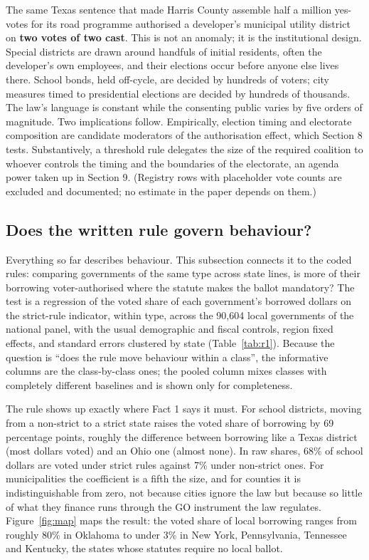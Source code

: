 
The same Texas sentence that made Harris County assemble half a million yes-votes for its road programme authorised a developer's municipal utility district on \textbf{two votes of two cast}. This is not an anomaly; it is the institutional design. Special districts are drawn around handfuls of initial residents, often the developer's own employees, and their elections occur before anyone else lives there. School bonds, held off-cycle, are decided by hundreds of voters; city measures timed to presidential elections are decided by hundreds of thousands. The law's language is constant while the consenting public varies by five orders of magnitude. Two implications follow. Empirically, election timing and electorate composition are candidate moderators of the authorisation effect, which Section 8 tests. Substantively, a threshold rule delegates the size of the required coalition to whoever controls the timing and the boundaries of the electorate, an agenda power taken up in Section 9. (Registry rows with placeholder vote counts are excluded and documented; no estimate in the paper depends on them.)

\subsection{Does the written rule govern behaviour?}
Everything so far describes behaviour. This subsection connects it to the coded rules: comparing governments of the same type across state lines, is more of their borrowing voter-authorised where the statute makes the ballot mandatory? The test is a regression of the voted share of each government's borrowed dollars on the strict-rule indicator, within type, across the 90,604 local governments of the national panel, with the usual demographic and fiscal controls, region fixed effects, and standard errors clustered by state (Table~\ref{tab:r1}). Because the question is ``does the rule move behaviour within a class'', the informative columns are the class-by-class ones; the pooled column mixes classes with completely different baselines and is shown only for completeness.


The rule shows up exactly where Fact 1 says it must. For school districts, moving from a non-strict to a strict state raises the voted share of borrowing by 69 percentage points, roughly the difference between borrowing like a Texas district (most dollars voted) and an Ohio one (almost none). In raw shares, 68\% of school dollars are voted under strict rules against 7\% under non-strict ones. For municipalities the coefficient is a fifth the size, and for counties it is indistinguishable from zero, not because cities ignore the law but because so little of what they finance runs through the GO instrument the law regulates. Figure~\ref{fig:map} maps the result: the voted share of local borrowing ranges from roughly 80\% in Oklahoma to under 3\% in New York, Pennsylvania, Tennessee and Kentucky, the states whose statutes require no local ballot.

